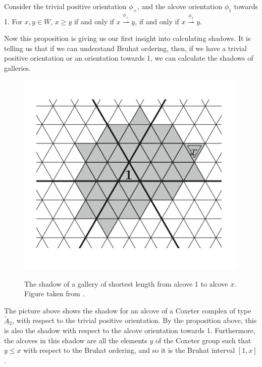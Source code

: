 \documentclass[11pt]{article}
\begin{document}
\begin{proposition}
    Consider the trivial positive orientation $\phi_+$, and the alcove orientation $\phi_1$ towards 1. For $x,y\in W$, $x\geq y$ if and only if $x\stackrel{\phi_+}{\rightharpoonup} y$, if and only if $x\stackrel{\phi_1}{\rightharpoonup} y$.
\end{proposition}

Now this proposition is giving us our first insight into calculating shadows. It is telling us that if we can understand Bruhat ordering, then, if we have a trivial positive orientation or an orientation towards 1, we can calculate the shadows of galleries.

\begin{figure}[!htbp]
    
    \begin{center}
        \includegraphics[scale=0.6]{Screenshot 2023-03-07 133912.png}\\
    \end{center}
    \caption{The shadow of a gallery of shortest length from alcove 1 to alcove $x$. Figure taken from \cite[p.141]{SHA}.}
\end{figure}

\begin{example}
    The picture above shows the shadow for an alcove of a Coxeter complex of type $\tilde{A}_2$, with respect to the trivial positive orientation. By the proposition above, this is also the shadow with respect to the alcove orientation towards 1. Furthermore, the alcoves in this shadow are all the elements $y$ of the Coxeter group such that $y\leq x$ with respect to the Bruhat ordering, and so it is the Bruhat interval $[1,x]$. 
\end{example}
\end{document}
